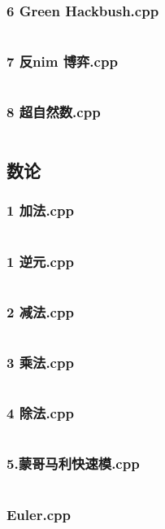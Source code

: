 \documentclass[a4paper,11pt]{article}
\begin{document}
\subsubsection{6 Green Hackbush.cpp}
\inputminted{c++}{"D:/tmplz/templates/数学/博弈/6 Green Hackbush.cpp"}
\subsubsection{7 反nim 博弈.cpp}
\inputminted{c++}{"D:/tmplz/templates/数学/博弈/7 反nim 博弈.cpp"}
\subsubsection{8 超自然数.cpp}
\inputminted{c++}{"D:/tmplz/templates/数学/博弈/8 超自然数.cpp"}
\subsection{数论}
\subsubsection{1 加法.cpp}
\inputminted{c++}{"D:/tmplz/templates/数学/数论/1 加法.cpp"}
\subsubsection{1 逆元.cpp}
\inputminted{c++}{"D:/tmplz/templates/数学/数论/1 逆元.cpp"}
\subsubsection{2 减法.cpp}
\inputminted{c++}{"D:/tmplz/templates/数学/数论/2 减法.cpp"}
\subsubsection{3 乘法.cpp}
\inputminted{c++}{"D:/tmplz/templates/数学/数论/3 乘法.cpp"}
\subsubsection{4 除法.cpp}
\inputminted{c++}{"D:/tmplz/templates/数学/数论/4 除法.cpp"}
\subsubsection{5.蒙哥马利快速模.cpp}
\inputminted{c++}{"D:/tmplz/templates/数学/数论/5.蒙哥马利快速模.cpp"}
\subsubsection{Euler.cpp}
\inputminted{c++}{"D:/tmplz/templates/数学/数论/Euler.cpp"}
\end{document}
